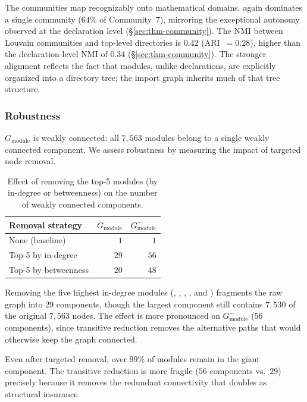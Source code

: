 The communities map recognizably onto mathematical domains.  again dominates a single community ($64\%$ of Community~$7$), mirroring the exceptional autonomy observed at the declaration level (\S\ref{sec:thm-community}). The NMI between Louvain communities and top-level directories is $0.42$ (ARI~$= 0.28$), higher than the declaration-level NMI of $0.34$ (\S\ref{sec:thm-community}). The stronger alignment reflects the fact that modules, unlike declarations, are explicitly organized into a directory tree; the import graph inherits much of that tree structure.


\subsubsection{Robustness}
\label{sec:robustness}
\label{sec:sa-robustness}

$G_{\mathrm{module}}$ is weakly connected: all $7{,}563$ modules belong to a single weakly connected component. We assess robustness by measuring the impact of targeted node removal.

\begin{table}[H]
\centering
\caption{Effect of removing the top-5 modules (by in-degree or betweenness) on the number of weakly connected components.}
\label{tab:robustness}
\begin{tabular}{lrr}
\toprule
Removal strategy & \multicolumn{1}{c}{$G_{\mathrm{module}}$} & \multicolumn{1}{c}{$G_{\mathrm{module}}^{-}$} \\
\midrule
None (baseline)          & $1$  & $1$  \\
Top-5 by in-degree       & $29$ & $56$ \\
Top-5 by betweenness     & $20$ & $48$ \\
\bottomrule
\end{tabular}
\end{table}

Removing the five highest in-degree modules (, , , , and ) fragments the raw graph into $29$ components, though the largest component still contains $7{,}530$ of the original $7{,}563$ nodes. The effect is more pronounced on $G_{\mathrm{module}}^{-}$ ($56$ components), since transitive reduction removes the alternative paths that would otherwise keep the graph connected.

\label{rem:robustness}
Even after targeted removal, over $99\%$ of modules remain in the giant component. The transitive reduction is more fragile ($56$ components vs.\ $29$) precisely because it removes the redundant connectivity that doubles as structural insurance.

